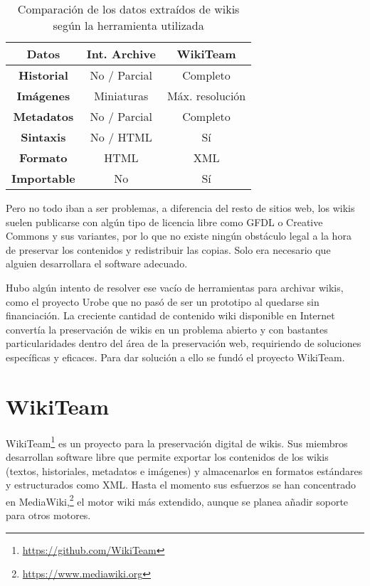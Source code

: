 \documentclass[14pt,twocolumn]{article}
\begin{document}
\begin{table}[]
	\centering
	\caption{Comparación de los datos extraídos de wikis según la herramienta utilizada}
	\label{table:datos}
	\begin{tabular}{|c|c|c|}
		\hline
		\multicolumn{1}{|c|}{\textbf{Datos}} & 
		\multicolumn{1}{|c|}{\textbf{Int. Archive}} & 
		\multicolumn{1}{|c|}{\textbf{WikiTeam}} \\ \hline
		\textbf{Historial} & No / Parcial & Completo \\ \hline
		\textbf{Imágenes} & Miniaturas & Máx. resolución \\ \hline
		\textbf{Metadatos} & No / Parcial & Completo \\ \hline
		\textbf{Sintaxis} & No / HTML & Sí \\ \hline
		\textbf{Formato} & HTML & XML \\ \hline
		\textbf{Importable} & No & Sí \\ \hline
	\end{tabular}
\end{table}

Pero no todo iban a ser problemas, a diferencia del resto de sitios web, los wikis suelen publicarse con algún tipo de licencia libre como GFDL o Creative Commons y sus variantes, por lo que no existe ningún obstáculo legal a la hora de preservar los contenidos y redistribuir las copias. Solo era necesario que alguien desarrollara el software adecuado.

Hubo algún intento de resolver ese vacío de herramientas para archivar wikis, como el proyecto Urobe\cite{popitsch2010} que no pasó de ser un prototipo al quedarse sin financiación. La creciente cantidad de contenido wiki disponible en Internet convertía la preservación de wikis en un problema abierto y con bastantes particularidades dentro del área de la preservación web, requiriendo de soluciones específicas y eficaces. Para dar solución a ello se fundó el proyecto WikiTeam.

\section{WikiTeam}

WikiTeam\footnote{\href{https://github.com/WikiTeam}{https://github.com/WikiTeam}} es un proyecto para la preservación digital de wikis. Sus miembros desarrollan software libre que permite exportar los contenidos de los wikis (textos, historiales, metadatos e imágenes) y almacenarlos en formatos estándares y estructurados como XML. Hasta el momento sus esfuerzos se han concentrado en MediaWiki,\footnote{\href{https://www.mediawiki.org}{https://www.mediawiki.org}} el motor wiki más extendido, aunque se planea añadir soporte para otros motores.
\end{document}
